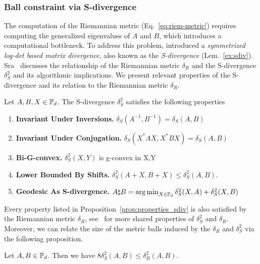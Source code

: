 \documentclass[sn-nature]{sn-jnl}%
\theoremstyle{thmstyleone}%
\theoremstyle{thmstyletwo}%
\theoremstyle{thmstylethree}%
\begin{document}
\subsubsection{Ball constraint via S-divergence}\label{sec:ball_constraint_sdiv}

The computation of the Riemannian metric (Eq.~\ref{eq:riem-metric})
requires computing the generalized eigenvalues of $A$ and $B$, which introduces a computational bottleneck. To address this problem, \cite{efficientsimilarityCherian} introduced a \textit{symmetrized log-det based matrix divergence}, also known as the \textit{S-divergence} (Lem.~\ref{ex:sdiv}). Sra~\cite{sra2013sdivergence} discusses the relationship of the Riemannian metric $\delta_R$ and the S-divergence $\delta_S^2$ and its algorithmic implications. We present relevant properties of the S-divergence and its relation to the Riemannian metric $\delta_R$. 
%
\begin{prop}\label{prop:properties_sdiv}
    Let $A,B, X \in \mathbb{P}_d$. The S-divergence $\delta_S^2$ satisfies the following properties 
    \begin{enumerate}
        \item \textbf{Invariant Under Inversions.} $\delta_S\left( A^{-1},B^{-1}\right) = \delta_S(A,B)$
        \item \textbf{Invariant Under Conjugation.} $\delta_S(X^* A X,  X^*BX) = \delta_S(A,B)$
        \item \textbf{Bi-G-convex.} $\delta_S^2(X,Y)$ is g-convex in X,Y
        \item \textbf{Lower Bounded By Shifts.} $\delta_S^2(A+X, B+X) \leq \delta_S^2(A,B)$.
        \item \textbf{Geodesic As S-divergence. }$A \sharp B = \operatorname*{arg\,min}_{X \in \mathbb{P}_d} \delta_S^2(X,A) + \delta_S^2(X,B)$
    \end{enumerate}
    \end{prop}
%
Every property listed in Proposition~\ref{prop:properties_sdiv} is also satisfied by the Riemannian metric $\delta_R$, see~\cite[Table 4]{sra2013sdivergence} for more shared properties of $\delta_S^2$ and $\delta_R$. Moreover, we can relate the size of the metric balls induced by the $\delta_R$ and $\delta_S^2$ via the following proposition.
%
    \begin{prop}\label{prop:sdivergence_Rdistance_bounds}
Let $A, B \in \mathbb{P}_d$. Then we have $8 \delta_S^2(A, B) \leq \delta_R^2(A, B)$.
    \end{prop}
\end{document}
